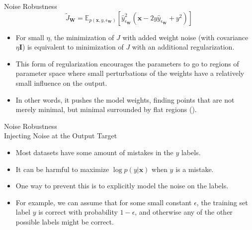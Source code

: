 \documentclass[10pt]{beamer}
\begin{document}
	\begin{frame}{Noise Robustness}
		$$\tilde{J}_{\bm{W}}=\mathbb{E}_{p(\bm{x},y,\epsilon_{\bm{W}})}\left[\hat{y}^2_{\epsilon_{\bm{W}}}(\bm{x}-2y\hat{y}_{\epsilon_{\bm{W}}}+y^2)\right]$$
		
		\begin{itemize}
			\item For small $\eta$, the minimization of $J$ with added weight noise (with covariance $\eta\bm{I}$) is equivalent to minimization of $J$ with an additional regularization.
			\pause
			\item This form of regularization encourages the parameters to go to regions of parameter space where small perturbations of the weights have a relatively small influence on the output.
			\pause
			\item In other words, it pushes the model weights, finding points that are not merely minimal, but minimal surrounded by flat regions (\citet{hochreiter1995simplifying}).
		\end{itemize}
	\end{frame}
	
	\begin{frame}{Noise Robustness\\ Injecting Noise at the Output Target}
		\begin{itemize}
			\item Most datasets have some amount of mistakes in the $y$ labels.
			\pause
			\item It can be harmful to maximize $\log p(y|\bm{x})$ when $y$ is a mistake.
			\pause
			\item One way to prevent this is to explicitly model the noise on the labels.
			\pause
			\item For example, we can assume that for some small constant $\epsilon$, the training set label $y$ is correct with probability $1-\epsilon$, and otherwise any of the other possible labels might be correct.
		\end{itemize}
	\end{frame}
\end{document}

